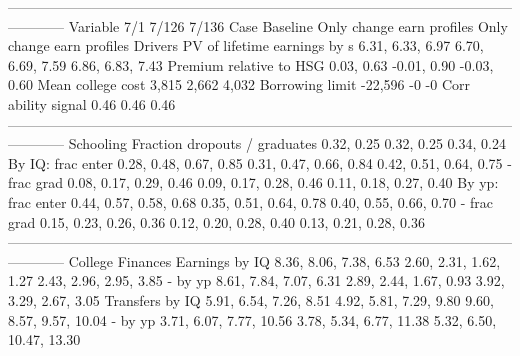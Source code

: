 ------------------------------------------------------------------------------------------------------------------------
                              Variable                         7/1                      7/126                      7/136
                                  Case                    Baseline  Only change earn profiles  Only change earn profiles
                               Drivers                                                                                  
          PV of lifetime earnings by s            6.31, 6.33, 6.97           6.70, 6.69, 7.59           6.86, 6.83, 7.43
               Premium relative to HSG                  0.03, 0.63                -0.01, 0.90                -0.03, 0.60
                     Mean college cost                       3,815                      2,662                      4,032
                       Borrowing limit                     -22,596                         -0                         -0
                   Corr ability signal                        0.46                       0.46                       0.46
------------------------------------------------------------------------------------------------------------------------
                             Schooling                                                                                  
         Fraction dropouts / graduates                  0.32, 0.25                 0.32, 0.25                 0.34, 0.24
                     By IQ: frac enter      0.28, 0.48, 0.67, 0.85     0.31, 0.47, 0.66, 0.84     0.42, 0.51, 0.64, 0.75
                           - frac grad      0.08, 0.17, 0.29, 0.46     0.09, 0.17, 0.28, 0.46     0.11, 0.18, 0.27, 0.40
                     By yp: frac enter      0.44, 0.57, 0.58, 0.68     0.35, 0.51, 0.64, 0.78     0.40, 0.55, 0.66, 0.70
                           - frac grad      0.15, 0.23, 0.26, 0.36     0.12, 0.20, 0.28, 0.40     0.13, 0.21, 0.28, 0.36
------------------------------------------------------------------------------------------------------------------------
                      College Finances                                                                                  
                        Earnings by IQ      8.36, 8.06, 7.38, 6.53     2.60, 2.31, 1.62, 1.27     2.43, 2.96, 2.95, 3.85
                               - by yp      8.61, 7.84, 7.07, 6.31     2.89, 2.44, 1.67, 0.93     3.92, 3.29, 2.67, 3.05
                       Transfers by IQ      5.91, 6.54, 7.26, 8.51     4.92, 5.81, 7.29, 9.80    9.60, 8.57, 9.57, 10.04
                               - by yp     3.71, 6.07, 7.77, 10.56    3.78, 5.34, 6.77, 11.38   5.32, 6.50, 10.47, 13.30
